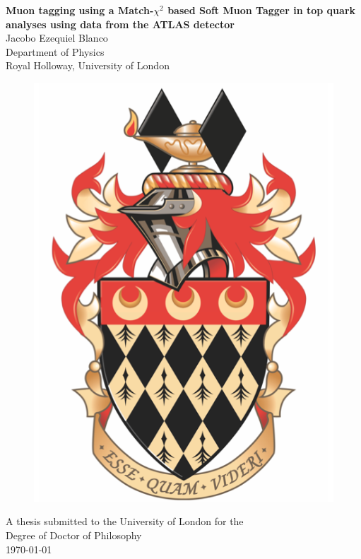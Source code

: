 \documentclass[11pt,a4paper]{report}
\begin{document}
\begin{titlepage}
\begin{center}
{\LARGE \textbf{Muon tagging using a Match-$\chi^{2}$ based Soft Muon Tagger in top quark analyses using data from the ATLAS detector\\}}
\vspace{1cm}
{\Large Jacobo Ezequiel Blanco\\}
\vspace{1cm}
{\large Department of Physics\\}
{\large Royal Holloway, University of London\\}

\end{center}
\begin{figure}[ht]
\begin{center}
\includegraphics[scale=0.3]{./res/RHULCrest.png}
\end{center}
\end{figure}

\begin{center}
    {A thesis submitted to the University of London for the \\Degree of Doctor of Philosophy\\}
\vspace{1cm}
{\today\\}
\end{center}
\end{titlepage}
\end{document}
